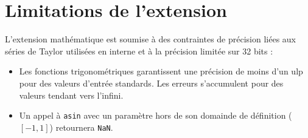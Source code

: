 \section{Limitations de l'extension}
\noindent
L'extension mathématique est soumise à des contraintes de précision liées aux séries de Taylor utilisées en interne et à la précision limitée sur 32 bits :

\begin{itemize}[label=$\circ$]
    \item Les fonctions trigonométriques garantissent une précision de moins d'un ulp pour des valeurs d'entrée standards. Les erreurs s'accumulent pour des valeurs tendant vers l'infini.
    \item Un appel à \texttt{asin} avec un paramètre hors de son domainde de définition ($[-1, 1]$) retournera \texttt{NaN}.
\end{itemize}